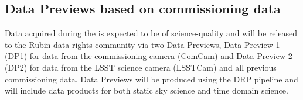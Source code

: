 \subsection{Data Previews based on commissioning data}

Data acquired during the \svs is expected to be of science-quality and will be released to the Rubin data rights community via two Data Previews, Data Preview 1 (DP1) for data from the commissioning camera (ComCam) and Data Preview 2 (DP2) for data from the LSST science camera (LSSTCam) and all previous commissioning data. 
Data Previews will be produced using the DRP pipeline and will include data products for both static sky science and time domain science.

